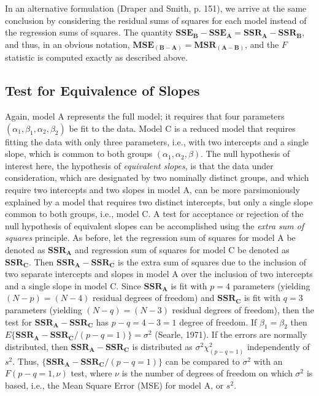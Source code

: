 \documentclass[11pt, oneside]{article}   	%
\begin{document}
\vspace{2 mm}

In an alternative formulation (Draper and Smith, p. 151), we arrive at the same conclusion by considering the residual sums of squares for each model instead of the regression sums of squares.  The quantity $ \mathbf{ SSE_{B}} - \mathbf{SSE_{A} }  =   \mathbf{SSR_{A}} -  \mathbf{SSR_{B}}  $, and thus, in an obvious notation, $ \mathbf{ MSE_{(B-A)}}   =  \mathbf{MSR_{(A-B)}} $, and the $  F  $ statistic is computed exactly as described above.
\bigskip

\subsection{Test for Equivalence of Slopes}
Again, model A represents the full model; it requires that four parameters $  (\alpha_{1}, \beta_{1}, \alpha_{2}, \beta_{2}) $ be fit to the data.  Model C is a reduced model that requires fitting the data with only three parameters, i.e., with two intercepts and a single slope, which is common to both groups $  (\alpha_{1},  \alpha_{2}, \beta)  $.  The null hypothesis of interest here, the hypothesis of \emph{equivalent slopes}, is that the data under consideration, which are designated by two nominally distinct groups, and which require two intercepts and two slopes in model A, can be more parsimoniously explained by a model that requires two distinct intercepts, but only a single slope common to both groups, i.e., model C.  A test for acceptance or rejection of the null hypothesis of equivalent slopes can be accomplished using the \emph{extra sum of squares} principle. As before, let the regression sum of squares for model A be denoted as $ \mathbf{SSR_{A}} $ and regression sum of squares for model C be denoted as $ \mathbf{SSR_{C}} $. Then $ \mathbf{SSR_{A}} -  \mathbf{SSR_{C}} $ is the extra sum of squares due to the inclusion of two separate intercepts and slopes in model A over the inclusion of two intercepts and a single slope in model C. Since  $ \mathbf{SSR_{A}} $ is fit with $ p = 4 $ parameters (yielding $ (N - p) = (N - 4) $ residual degrees of freedom) and  $  \mathbf{SSR_{C}} $ is fit with $ q = 3 $ parameters (yielding $  (N - q) = (N - 3) $ residual degrees of freedom), then the test for $ \mathbf{SSR_{A}} -  \mathbf{SSR_{C}} $ has $  p - q = 4 - 3 = 1  $ degree of freedom.  If $ \beta_{1} = \beta_ {2} $ then $ E\{  \mathbf{SSR_{A}} -  \mathbf{SSR_{C}}   / (p - q = 1) \} = \sigma^{2} $ (Searle, 1971).  If the errors are normally distributed, then $ \mathbf{SSR_{A}} -  \mathbf{SSR_{C}} $ is distributed as  $ \sigma^{2} \chi^{2}_{(p-q=1)}  $ independently of $ s^{2}  $.  Thus, $ \{  \mathbf{SSR_{A}} -  \mathbf{SSR_{C}}   / (p - q = 1) \} $ can be compared to $ \sigma^{2} $ with an $ F(p-q =1, \nu) $ test, where $ \nu $ is the number of degrees of freedom on which $ \sigma^{2} $ is based, i.e., the Mean Square Error (MSE) for model A, or $  s^2 $.  
\vspace{2 mm}
 
\end{document}

